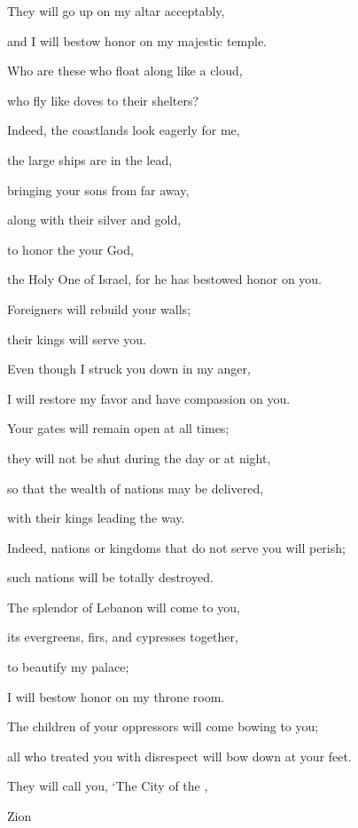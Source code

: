 {\par }{\Q They will go up
on
my altar
acceptably,
\par }{\Q and I will bestow honor
on my majestic
temple.
\par }{\Q {}Who
are these
who float along like a cloud,
\par }{\Q who fly
like doves
to
their shelters?
\par }{\Q {}Indeed,
the coastlands
look
eagerly for me,
\par }{\Q the large ships
are in the lead,
\par }{\Q bringing
your sons
from far away,
\par }{\Q along with
their silver
and gold,
\par }{\Q to honor
the {}
your God,
\par }{\Q the Holy One
of Israel,
for
he has bestowed honor on you.
\par }{\Q {}Foreigners
will rebuild
your walls;
\par }{\Q their kings
will serve
you.
\par }{\Q Even though
I struck
you down in my anger,
\par }{\Q I will restore my favor
and have compassion on you.
\par }{\Q {}Your gates
will remain open
at all times;
\par }{\Q they will not
be shut
during the day
or at night,
\par }{\Q so that the wealth
of nations
may be delivered,
\par }{\Q with their kings
leading the way.
\par }{\Q {}Indeed,
nations
or kingdoms
that
do not
serve
you will perish;
\par }{\Q such nations
will be totally destroyed.
\par }{\Q {}The splendor
of Lebanon
will come
to you,
\par }{\Q its evergreens,
firs,
and cypresses
together,
\par }{\Q to beautify
my palace;
\par }{\Q I will bestow honor on my throne room.
\par }{\Q {}The children of
your oppressors
will come
bowing
to
you;
\par }{\Q all
who treated
you with disrespect
will bow down
at your feet.
\par }{\Q They will call
you, ‘The City
of the
{},
\par }{\Q Zion
}
